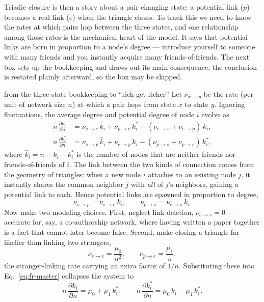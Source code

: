 Triadic closure is then a story about a pair changing state: a potential link
($p$) becomes a real link ($e$) when the triangle closes. To track this we need
to know the rates at which pairs hop between the three states, and one
relationship among those rates is the mechanical heart of the model. It says
that potential links are born in proportion to a node's degree --- introduce
yourself to someone with many friends and you instantly acquire many
friends-of-friends. The next box sets up the bookkeeping and draws out its main
consequence; the conclusion is restated plainly afterward, so the box may be
skipped.

\begin{calculation}{from the three-state bookkeeping to ``rich get richer''}
Let $\nu_{x\to y}$ be the rate (per unit of network size $n$) at which a pair
hops from state $x$ to state $y$. Ignoring fluctuations, the average degree and
potential degree of node $i$ evolve as
\begin{align}
  n\,\frac{\partial k_i}{\partial n}
    &= \nu_{s\to e}\,\hat k_i + \nu_{p\to e}\,k^*_i
       - (\nu_{e\to s}+\nu_{e\to p})\,k_i, \nonumber\\
  n\,\frac{\partial k^*_i}{\partial n}
    &= \nu_{s\to p}\,\hat k_i + \nu_{e\to p}\,k_i
       - (\nu_{p\to s}+\nu_{p\to e})\,k^*_i,
  \label{eq:fr-master}
\end{align}
where $\hat k_i = n - k_i - k^*_i$ is the number of nodes that are neither
friends nor friends-of-friends of $i$. The link between the two kinds of
connection comes from the geometry of triangles: when a new node $i$ attaches to
an existing node $j$, it instantly shares the common neighbor $j$ with \emph{all}
of $j$'s neighbors, gaining a potential link to each. Hence potential links are
spawned in proportion to degree,
\begin{equation}
  \nu_{s\to p} = \nu_{s\to e}\, k_i, \qquad
  \nu_{p\to s} = \nu_{e\to s}\, k_i.
  \label{eq:fr-coupling}
\end{equation}
Now make two modeling choices. First, neglect link deletion, $\nu_{e\to s}=0$ ---
accurate for, say, a co-authorship network, where having written a paper together
is a fact that cannot later become false. Second, make closing a triangle far
likelier than linking two strangers,
\begin{equation}
  \nu_{s\to e} = \frac{\mu_0}{n^2}, \qquad
  \nu_{p\to e} = \frac{\mu_1}{n},
  \label{eq:fr-rates}
\end{equation}
the stranger-linking rate carrying an extra factor of $1/n$. Substituting these
into Eq.~\eqref{eq:fr-master} collapses the system to
\begin{equation}
  n\,\frac{\partial k_i}{\partial n} = \mu_0 + \mu_1\, k^*_i, \qquad
  n\,\frac{\partial k^*_i}{\partial n} = \mu_0\, k_i - \mu_1\, k^*_i.
  \label{eq:fr-reduced}
\end{equation}
\end{calculation}

